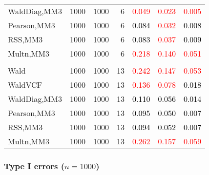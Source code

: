 \documentclass[
]{article}
\begin{document}
\begin{table}[H]
{\begin{tabular}[t]{lrrrrrr}
\hspace{1em}WaldDiag,MM3 & 1000 & 1000 & 6 & \textcolor{red}{0.049} & \textcolor{red}{0.023} & \textcolor{red}{0.005}\\
\hspace{1em}Pearson,MM3 & 1000 & 1000 & 6 & \textcolor{black}{0.084} & \textcolor{red}{0.032} & \textcolor{black}{0.008}\\
\hspace{1em}RSS,MM3 & 1000 & 1000 & 6 & \textcolor{black}{0.083} & \textcolor{red}{0.037} & \textcolor{black}{0.009}\\
\hspace{1em}Multn,MM3 & 1000 & 1000 & 6 & \textcolor{red}{0.218} & \textcolor{red}{0.140} & \textcolor{red}{0.051}\\
\addlinespace[0.3em]
\multicolumn{7}{l}{\textbf{3F 15V}}\\
\hspace{1em}Wald & 1000 & 1000 & 13 & \textcolor{red}{0.242} & \textcolor{red}{0.147} & \textcolor{red}{0.053}\\
\hspace{1em}WaldVCF & 1000 & 1000 & 13 & \textcolor{red}{0.136} & \textcolor{red}{0.078} & \textcolor{black}{0.018}\\
\hspace{1em}WaldDiag,MM3 & 1000 & 1000 & 13 & \textcolor{black}{0.110} & \textcolor{black}{0.056} & \textcolor{black}{0.014}\\
\hspace{1em}Pearson,MM3 & 1000 & 1000 & 13 & \textcolor{black}{0.095} & \textcolor{black}{0.050} & \textcolor{black}{0.007}\\
\hspace{1em}RSS,MM3 & 1000 & 1000 & 13 & \textcolor{black}{0.094} & \textcolor{black}{0.052} & \textcolor{black}{0.007}\\
\hspace{1em}Multn,MM3 & 1000 & 1000 & 13 & \textcolor{red}{0.262} & \textcolor{red}{0.157} & \textcolor{red}{0.059}\\
\bottomrule
\end{tabular}}
\endgroup{}
\end{table}

\hypertarget{type-i-errors-n1000-2}{%
\subsubsection{\texorpdfstring{Type I errors
(\(n=1000\))}{Type I errors (n=1000)}}\label{type-i-errors-n1000-2}}
\end{document}
